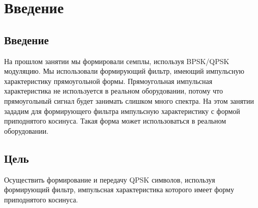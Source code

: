 \chapter{Введение}
\label{ch:intro}

\section{Введение}

На прошлом занятии мы формировали семплы, используя BPSK/QPSK модуляцию. Мы использовали формирующий фильтр, имеющий
импульсную характеристику прямоугольной формы. Прямоугольная импульсная характеристика не используется в реальном оборудовании, потому 
что прямоугольный сигнал будет занимать слишком много спектра. На этом занятии зададим для формирующего фильтра импульсную характеристику
с формой приподнятого косинуса. Такая форма может использоваться в реальном оборудовании.

\section{Цель}

Осуществить формирование и передачу QPSK символов, используя формирующий фильтр, импульсная
характеристика которого имеет форму приподнятого косинуса.


\endinput